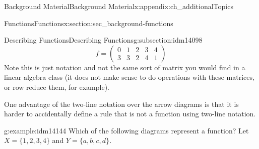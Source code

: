 \documentclass[oneside,10pt,]{book}
\numberwithin{equation}{chapter}
\newcommand{\twoline}[2]{\begin{pmatrix}#1 \\ #2 \end{pmatrix}}
\newcommand{\amp}{&}
\begin{document}
\begin{appendixptx}{Background Material}{}{Background Material}{}{}{x:appendix:ch_additionalTopics}
\begin{sectionptx}{Functions}{}{Functions}{}{}{x:section:sec_background-functions}
\begin{subsectionptx}{Describing Functions}{}{Describing Functions}{}{}{g:subsection:idm14098}
\begin{equation*}
f = \twoline{0 \amp 1 \amp 2\amp 3 \amp 4}{3 \amp 3 \amp 2 \amp 4 \amp 1}
\end{equation*}
Note this is just notation and not the same sort of matrix you would find in a linear algebra class (it does not make sense to do operations with these matrices, or row reduce them, for example).%
\par
One advantage of the two-line notation over the arrow diagrams is that it is harder to accidentally define a rule that is not a function using two-line notation.%
\begin{example}{}{g:example:idm14144}%
Which of the following diagrams represent a function? Let \(X = \{1,2,3,4\}\) and \(Y = \{a,b,c,d\}\).%
\begin{sidebyside}{3}{0.0416666666666667}{0.0416666666666667}{0.0833333333333333}%
\begin{sbspanel}{0.25}%
%
\end{sbspanel}%
\begin{sbspanel}{0.25}%
%
\end{sbspanel}%
\begin{sbspanel}{0.25}%
\end{sbspanel}
\end{sidebyside}
\end{example}
\end{subsectionptx}
\end{sectionptx}
\end{appendixptx}
\end{document}
